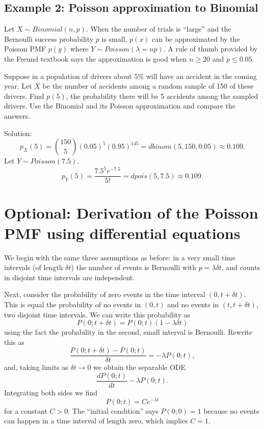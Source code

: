 \documentclass[
]{book}
\begin{document}
\hypertarget{example-2-poisson-approximation-to-binomial}{%
\subsection{Example 2: Poisson approximation to Binomial}\label{example-2-poisson-approximation-to-binomial}}

Let \(X\sim Binomial(n,p)\). When the number of trials is ``large'' and the Bernoulli success probability \(p\) is small, \(p(x)\) can be approximated by the Poisson PMF \(p(y)\) where \(Y\sim Poisson(\lambda = np)\). A rule of thumb provided by the Freund textbook says the approximation is good when \(n\geq 20\) and \(p\leq 0.05\).

Suppose in a population of drivers about \(5\%\) will have an accident in the coming year. Let \(X\) be the number of accidents among a random sample of 150 of these drivers. Find \(p(5)\), the probability there will be 5 accidents among the sampled drivers. Use the Binomial and its Poisson approximation and compare the answers.

Solution:
\[p_X(5) = {150 \choose 5}(0.05)^5(0.95)^{145} = dbinom(5,150,0.05) \approx 0.109. \]
Let \(Y \sim Poisson(7.5)\).
\[p_Y(5) = \frac{7.5^5 e^{-7.5}}{5!} = dpois(5,7.5) \approx 0.109. \]

\hypertarget{optional-derivation-of-the-poisson-pmf-using-differential-equations}{%
\section{Optional: Derivation of the Poisson PMF using differential equations}\label{optional-derivation-of-the-poisson-pmf-using-differential-equations}}

We begin with the same three assumptions as before: in a very small time intervals (of length \(\delta t\)) the number of events is Bernoulli with \(p=\lambda\delta t\), and counts in disjoint time intervals are independent.

Next, consider the probability of zero events in the time interval \((0, t+\delta t)\). This is equal the probability of no events in \((0,t)\) and no events in \((t, t+\delta t)\), two disjoint time intervals. We can write this probability as
\[P(0; t+\delta t) = P(0;t)(1-\lambda \delta t)\]
using the fact the probability in the second, small interval is Bernoulli. Rewrite this as
\[\frac{P(0;t+\delta t)-P(0;t)}{\delta t} = -\lambda P(0;t),\]
and, taking limits as \(\delta t \rightarrow 0\) we obtain the separable ODE
\[\frac{dP(0;t)}{dt} - \lambda P(0;t).\]
Integrating both sides we find
\[P(0;t) = Ce^{-\lambda t}\]
for a constant \(C>0\). The ``initial condition'' says \(P(0;0) = 1\) because no events can happen in a time interval of length zero, which implies \(C=1\).
\end{document}

